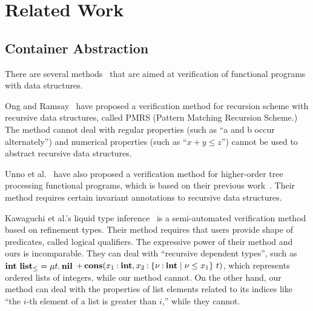 \section{Related Work}
\label{sec:related}

\subsection{Container Abstraction}
There are several
methods~\cite{Ong2011,Kobayashi2010,Unno2010,Rondon2008,Kawaguchi2009,Chin2003}
that are aimed at verification of functional programs with data
structures.

Ong and Ramsay~\cite{Ong2011} have proposed a verification method
for recursion scheme with recursive data structures, called PMRS (Pattern
Matching Recursion Scheme.)  The method
cannot deal with regular properties (such as ``a and b occur
alternately'') and numerical properties (such as ``$x+y \leq z$'') cannot be used
to abstract recursive data structures.

Unno et al.~\cite{Unno2010} have also proposed a verification method for
higher-order tree processing functional programs, which is based on
their previous work~\cite{Kobayashi2010}. Their method requires certain
invariant annotations to recursive data structures.

Kawaguchi et al.'s liquid type inference~\cite{Kawaguchi2009,Rondon2008} is a
semi-automated verification method based on refinement types.  Their method requires
that users provide shape of predicates, called logical qualifiers.  The
expressive power of their method and ours is incomparable.  They can
deal with ``recursive dependent types'', such as ${\mathbf{int}}~{\mathbf{list}_\leq}
= \mu t.\, \mathbf{nil}$ $\mathop{+}
\mathbf{cons}({x_1\mathbin{:}\mathbf{int}},{x_2\mathbin{:}{\{\nu\mathbin{:}\mathbf{int} \mid \nu \leq x_1\}}~{t}})$,
which represents ordered lists of integers, while our method cannot. On
the other hand, our method can deal with the properties of list elements
related to its indices like ``the $i$-th element of a list is greater
than $i$,'' while they cannot.

